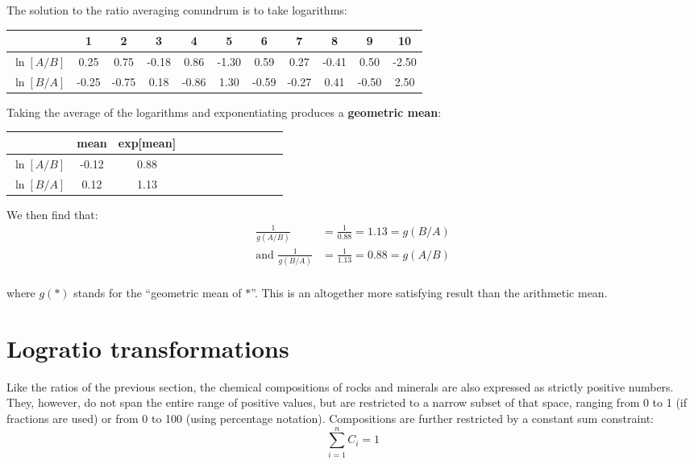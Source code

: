 The solution to the ratio averaging conundrum is to take logarithms:

\begin{center}
  \begin{tabular}{c|cccccccccc}
    & 1 & 2 & 3 & 4 & 5 & 6 & 7 & 8 & 9 & 10 \\ \hline
    $\ln[A/B]$ & 0.25 & 0.75 & -0.18 & 0.86 & -1.30 &
    0.59 & 0.27 & -0.41 & 0.50 & -2.50 \\
    $\ln[B/A]$ & -0.25 & -0.75 & 0.18 & -0.86 & 1.30 &
    -0.59 & -0.27 & 0.41 & -0.50 & 2.50 \\
  \end{tabular}
\end{center}

Taking the average of the logarithms and exponentiating produces a
\textbf{geometric mean}:

\begin{center}
  \begin{tabular}{c|cccccccccc|c}
    &  mean & exp[mean] \\ \hline
    $\ln[A/B]$ & -0.12 & 0.88 \\
    $\ln[B/A]$ & 0.12 & 1.13 \\
  \end{tabular}
\end{center}

We then find that:
\[
\begin{split}
  \frac{1}{g(A/B)} & = \frac{1}{0.88} = 1.13 = g(B/A) \\
  \mbox{and~}\frac{1}{g(B/A)} & = \frac{1}{1.13} = 0.88 = g(A/B) \\
\end{split}
\]

\noindent where $g(\ast)$ stands for the ``geometric mean of $\ast$''.
This is an altogether more satisfying result than the arithmetic mean.

\section{Logratio transformations}
\label{sec:logratios}

Like the ratios of the previous section, the chemical compositions of
rocks and minerals are also expressed as strictly positive
numbers. They, however, do not span the entire range of positive
values, but are restricted to a narrow subset of that space, ranging
from 0 to 1 (if fractions are used) or from 0 to 100 (using percentage
notation).  Compositions are further restricted by a constant sum
constraint:
\[
\sum_{i=1}^n C_i = 1
\]

